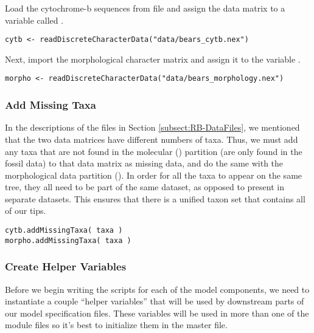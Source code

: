 Load the cytochrome-b sequences from file and assign the data matrix to a variable called .
{\tt \begin{snugshade*}
\begin{lstlisting}
cytb <- readDiscreteCharacterData("data/bears_cytb.nex") 
\end{lstlisting}
\end{snugshade*}}

Next, import the morphological character matrix and assign it to the variable . 
{\tt \begin{snugshade*}
\begin{lstlisting}
morpho <- readDiscreteCharacterData("data/bears_morphology.nex")
\end{lstlisting}
\end{snugshade*}}

 

\medskip
\subsubsection{Add Missing Taxa}\label{subsub:RB-AddMissing}

In the descriptions of the files in Section \ref{subsect:RB-DataFiles}, we mentioned that the two data matrices have different numbers of taxa. 
Thus, we must add any taxa that are not found in the molecular () partition (\IE are only found in the fossil data) to that data matrix as missing data, and do the same with the morphological data partition ().
In order for all the taxa to appear on the same tree, they all need to be part of the same dataset, as opposed to present in separate datasets. 
This ensures that there is a unified taxon set that contains all of our tips.
{\tt \begin{snugshade*}
\begin{lstlisting}
cytb.addMissingTaxa( taxa )
morpho.addMissingTaxa( taxa )
\end{lstlisting}
\end{snugshade*}}


\medskip
\subsubsection{Create Helper Variables}\label{subsub:RB-mviVar}

Before we begin writing the \Rev scripts for each of the model components, we need to instantiate a couple ``helper variables'' that will be used by downstream parts of our model specification files. 
These variables will be used in more than one of the module files so it's best to initialize them in the master file.

